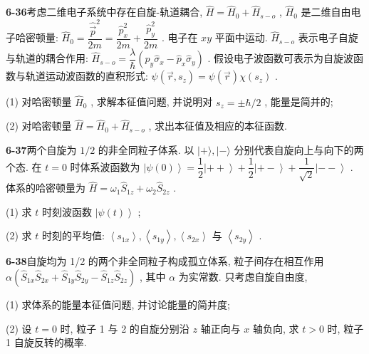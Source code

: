 \textbf{6-36}\quad 考虑二维电子系统中存在自旋-轨道耦合, $\displaystyle \hat{H} = \hat{H}_0 + \hat{H}_{s-o}$ , $\displaystyle \hat{H}_0$ 是二维自由电子哈密顿量: $\displaystyle \hat{H}_0 = \dfrac{\hat{\vec{p}}^{2}}{2m} = \dfrac{\hat{p}_x^2}{2m} + \dfrac{\hat{p}_y^2}{2m}$ . 电子在 $\displaystyle xy$ 平面中运动. $\displaystyle \hat{H}_{s-o}$ 表示电子自旋与轨道的耦合作用: $\displaystyle \hat{H}_{s-o} = \dfrac{\lambda}{\hbar} (\hat{p}_y \hat{\sigma}_x - \hat{p}_x \hat{\sigma}_y)$ . 假设电子波函数可表示为自旋波函数与轨道运动波函数的直积形式: $\displaystyle \psi(\vec{r}, s_z) = \psi(\vec{r}) \chi(s_z)$ .

(1) 对哈密顿量 $\displaystyle \hat{H}_0$ , 求解本征值问题, 并说明对 $\displaystyle s_z = \pm \hbar / 2$ , 能量是简并的;

(2) 对哈密顿量 $\displaystyle \hat{H} = \hat{H}_0 + \hat{H}_{s-o}$ , 求出本征值及相应的本征函数.

\vfill

\newpage

\textbf{6-37}\quad 两个自旋为 $\displaystyle 1/2$ 的非全同粒子体系. 以 $\displaystyle |+\rangle, |-\rangle$ 分别代表自旋向上与向下的两个态. 在 $\displaystyle t = 0$ 时体系波函数为 $\displaystyle \left|\psi(0)\right\rangle = \dfrac{1}{2}\left|++\right\rangle + \dfrac{1}{2}\left|+-\right\rangle + \dfrac{1}{\sqrt{2}}\left|--\right\rangle$ . 体系的哈密顿量为 $\displaystyle \hat{H} = \omega_1 \hat{S}_{1z} + \omega_2 \hat{S}_{2z}$ .

(1) 求 $\displaystyle t$ 时刻波函数 $\displaystyle \left|\psi(t)\right\rangle$ ;

(2) 求 $\displaystyle t$ 时刻的平均值: $\displaystyle \left\langle s_{1x}\right\rangle, \left\langle s_{1y}\right\rangle, \left\langle s_{2x}\right\rangle$ 与 $\displaystyle \left\langle s_{2y}\right\rangle$ .

\vfill

\newpage

\textbf{6-38}\quad 自旋均为 1/2 的两个非全同粒子构成孤立体系, 粒子间存在相互作用 $\displaystyle \alpha(\hat{S}_{1x}\hat{S}_{2x} + \hat{S}_{1y}\hat{S}_{2y} - \hat{S}_{1z}\hat{S}_{2z})$ , 其中 $\displaystyle \alpha$ 为实常数. 只考虑自旋自由度,

(1) 求体系的能量本征值问题, 并讨论能量的简并度;

(2) 设 $\displaystyle t = 0$ 时, 粒子 1 与 2 的自旋分别沿 $\displaystyle z$ 轴正向与 $\displaystyle x$ 轴负向, 求 $\displaystyle t > 0$ 时, 粒子 1 自旋反转的概率.

\vfill

